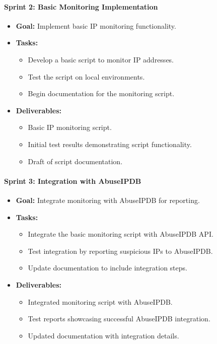 \documentclass{article}
\begin{document}
    \paragraph{Sprint 2: Basic Monitoring Implementation}
    \begin{itemize}
        \item \textbf{Goal:} Implement basic IP monitoring functionality.
        \item \textbf{Tasks:}
        \begin{itemize}
            \item Develop a basic script to monitor IP addresses.
            \item Test the script on local environments.
            \item Begin documentation for the monitoring script.
        \end{itemize}
        \item \textbf{Deliverables:}
        \begin{itemize}
            \item Basic IP monitoring script.
            \item Initial test results demonstrating script functionality.
            \item Draft of script documentation.
        \end{itemize}
    \end{itemize}

    \paragraph{Sprint 3: Integration with AbuseIPDB}
    \begin{itemize}
        \item \textbf{Goal:} Integrate monitoring with AbuseIPDB for reporting.
        \item \textbf{Tasks:}
        \begin{itemize}
            \item Integrate the basic monitoring script with AbuseIPDB API\@.
            \item Test integration by reporting suspicious IPs to AbuseIPDB\@.
            \item Update documentation to include integration steps.
        \end{itemize}
        \item \textbf{Deliverables:}
        \begin{itemize}
            \item Integrated monitoring script with AbuseIPDB\@.
            \item Test reports showcasing successful AbuseIPDB integration.
            \item Updated documentation with integration details.
        \end{itemize}
    \end{itemize}
\end{document}
